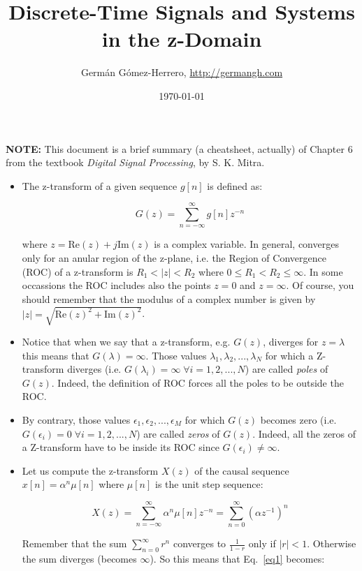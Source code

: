 \documentclass[a4paper,11pt,oneside]{article}
\title{Discrete-Time Signals and Systems in the z-Domain}
\date{\today}
\author{Germ\'an G\'omez-Herrero, \url{http://germangh.com}}
\begin{document}
\maketitle


\textbf{NOTE:} This document is a brief summary (a cheatsheet, actually) of Chapter 6 from the textbook \emph{Digital Signal Processing}, by S. K. Mitra. 



\begin{itemize}

\item The z-transform of a given sequence $g[n]$ is defined as:

\[
G(z) = \sum_{n=-\infty}^{\infty}g[n]z^{-n}
\]

where $z=\textrm{Re}(z)+j\textrm{Im}(z)$ is a complex variable. In general, converges only for an anular region of the z-plane, i.e. the Region of Convergence (ROC) of a z-transform is $R_{1}<|z|<R_{2}$ where $0\leq R_{1}<R_{2}\leq\infty$. In some occassions the ROC includes also the points $z=0$ and $z=\infty$. Of course, you should remember that the modulus of a complex number is given by $|z|=\sqrt{\textrm{Re}(z)^2+\textrm{Im}(z)^2}$. 

\item Notice that when we say that a z-transform, e.g. $G(z)$, diverges for $z=\lambda$ this means that $G(\lambda)=\infty$. Those values $\lambda_1,\lambda_2,...,\lambda_{N}$ for which a Z-transform diverges (i.e. $G(\lambda_i)=\infty \;\forall i=1,2,...,N$) are called \emph{poles} of $G(z)$. Indeed, the definition of ROC forces all the poles to be outside the ROC.

\item By contrary, those values $\epsilon_1,\epsilon_2,...,\epsilon_M$ for which $G(z)$ becomes zero (i.e. $G(\epsilon_i)=0 \;\forall i=1,2,...,N$) are called \emph{zeros} of $G(z)$. Indeed, all the zeros of a Z-transform have to be inside its ROC since $G(\epsilon_i)\neq \infty$.


\item Let us compute the z-transform $X(z)$ of the causal sequence $x[n]=\alpha^{n}\mu[n]$ where $\mu[n]$ is the unit step sequence:

\begin{equation}\label{eq1}
X(z)=\sum_{n=-\infty}^{\infty}\alpha^n\mu[n]z^{-n}=\sum_{n=0}^{\infty}(\alpha z^{-1})^n
\end{equation}

Remember that the sum $\sum_{n=0}^{\infty}r^n$ converges to $\frac{1}{1-r}$ only if $|r|<1$. Otherwise the sum diverges (becomes $\infty$). So this means that Eq.~\ref{eq1} becomes:


\end{itemize}
\end{document}

